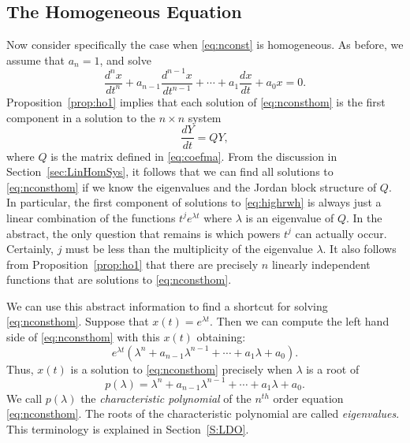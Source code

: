 \documentclass{ximera}
\begin{document}
\subsection*{The Homogeneous Equation}

Now consider specifically the case when \eqref{eq:nconst} is homogeneous.  
As before, we assume that $a_n=1$, and solve
\begin{equation}  \label{eq:nconsthom}
\frac{d^nx}{dt^n} + a_{n-1}\frac{d^{n-1}x}{dt^{n-1}} +
\cdots + a_1\frac{dx}{dt}+a_0x = 0.
\end{equation}
Proposition~\ref{prop:ho1} implies that each solution
of \eqref{eq:nconsthom} is the first component in a solution
to the $n\times n$ system 
\begin{equation}  \label{eq:highrwh}
\frac{dY}{dt} = QY,
\end{equation}
where $Q$ is the matrix defined in \eqref{eq:coefma}.  From the discussion 
in Section~\ref{sec:LinHomSys}, it follows that we can find all solutions 
to \eqref{eq:nconsthom} if we know the eigenvalues and the 
Jordan block 
structure of $Q$.  In particular, the first component of solutions to 
\eqref{eq:highrwh} is always just a linear combination of the 
functions 
$t^je^{\lambda t}$ where $\lambda$ is an eigenvalue of $Q$.  In the 
abstract, the only question that remains is which powers $t^j$ can 
actually occur.  Certainly, $j$ must be less than the multiplicity of the 
eigenvalue $\lambda$.  It also follows from Proposition~\ref{prop:ho1}
that there are precisely $n$ linearly independent functions that are 
solutions to \eqref{eq:nconsthom}.

We can use this abstract information to find a shortcut for solving 
\eqref{eq:nconsthom}.  Suppose that $x(t)=e^{\lambda t}$.  Then we can 
compute the left hand side of \eqref{eq:nconsthom} with this $x(t)$ 
obtaining:
\begin{equation}  \label{e:elam}
e^{\lambda t}\left(\lambda^n + a_{n-1}\lambda^{n-1}+\cdots+a_1\lambda
+a_0\right).
\end{equation}
Thus, $x(t)$ is a solution to \eqref{eq:nconsthom} precisely when $\lambda$
is a root of 
\begin{equation} \label{E:charpoly}
p(\lambda) = \lambda^n + a_{n-1}\lambda^{n-1}+\cdots+a_1\lambda +a_0.
\end{equation}
We call $p(\lambda)$ the {\em characteristic polynomial\/}
 of the $n^{th}$ 
order equation \eqref{eq:nconsthom}.  The roots of the characteristic polynomial
are called {\em eigenvalues\/}.   
This terminology is explained in Section~\ref{S:LDO}.
 
\end{document}
